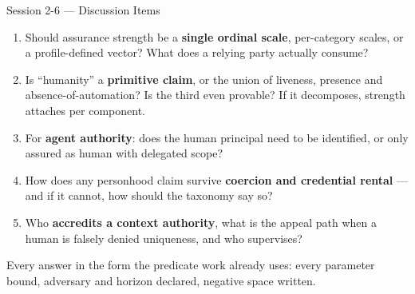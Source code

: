 \documentclass[aspectratio=169,10pt]{beamer}
\begin{document}
\begin{frame}{Session 2-6 --- Discussion Items}
  \begin{enumerate}\small
    \item Should assurance strength be a \textbf{single ordinal scale}, per-category scales, or a profile-defined vector? What does a relying party actually consume?
    \item Is ``humanity'' a \textbf{primitive claim}, or the union of liveness, presence and absence-of-automation? Is the third even provable? If it decomposes, strength attaches per component.
    \item For \textbf{agent authority}: does the human principal need to be identified, or only assured as human with delegated scope?
    \item How does any personhood claim survive \textbf{coercion and credential rental} --- and if it cannot, how should the taxonomy say so?
    \item Who \textbf{accredits a context authority}, what is the appeal path when a human is falsely denied uniqueness, and who supervises?
  \end{enumerate}
  \par\vspace{1mm}
  {\small Every answer in the form the predicate work already uses: every parameter bound, adversary and horizon declared, negative space written.}
\end{frame}
\end{document}
